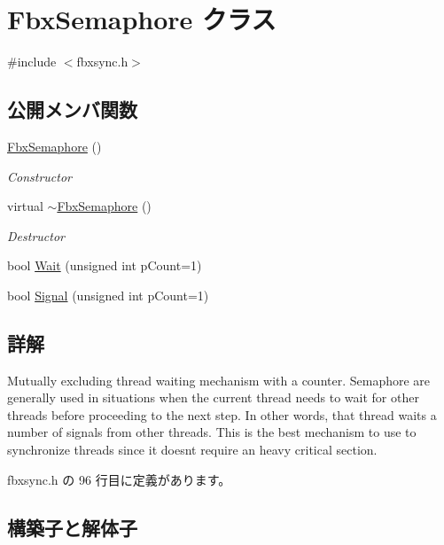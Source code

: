 \hypertarget{class_fbx_semaphore}{}\section{Fbx\+Semaphore クラス}
\label{class_fbx_semaphore}


{\ttfamily \#include $<$fbxsync.\+h$>$}

\subsection*{公開メンバ関数}
\begin{DoxyCompactItemize}
\item 
\hyperlink{class_fbx_semaphore_a4c1d63129606a43f25d00cebe24eb239}{Fbx\+Semaphore} ()
\begin{DoxyCompactList}\small\item\em Constructor \end{DoxyCompactList}\item 
virtual \hyperlink{class_fbx_semaphore_aea00e26f6b9452107104eaf2f2e49f1b}{$\sim$\+Fbx\+Semaphore} ()
\begin{DoxyCompactList}\small\item\em Destructor \end{DoxyCompactList}\item 
bool \hyperlink{class_fbx_semaphore_a05d7cdaa49c89691f22a26851be1f885}{Wait} (unsigned int p\+Count=1)
\item 
bool \hyperlink{class_fbx_semaphore_a56bdff92c29ea31a57003f207e52c672}{Signal} (unsigned int p\+Count=1)
\end{DoxyCompactItemize}


\subsection{詳解}
Mutually excluding thread waiting mechanism with a counter. Semaphore are generally used in situations when the current thread needs to wait for other threads before proceeding to the next step. In other words, that thread waits a number of signals from other threads. This is the best mechanism to use to synchronize threads since it doesn\textquotesingle{}t require an heavy critical section. 

 fbxsync.\+h の 96 行目に定義があります。



\subsection{構築子と解体子}
\mbox{\label{class_fbx_semaphore_a4c1d63129606a43f25d00cebe24eb239}} 
